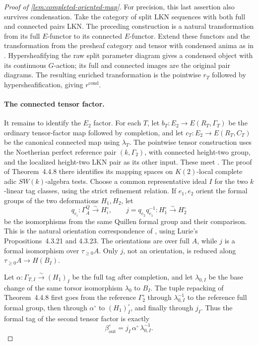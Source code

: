 \documentclass[11pt]{article}
\numberwithin{equation}{section}
\theoremstyle{definition}
\theoremstyle{remark}
\begin{document}
\begin{proof}[Proof of \cref{lem:completed-oriented-map}]
For precision, this last assertion also survives condensation. Take the
category of split LKN sequences with both full and connected pairs LKN.
The preceding construction is a natural transformation from its full
\(E\)-functor to its connected \(E\)-functor. Extend these functors and
the transformation from the presheaf category and tensor with condensed
anima as in \cite[Construction~4.5.2]{BMR2026}. Hypersheafifying the raw
split parameter diagram gives a condensed object with its continuous
\(G\)-action; its full and connected images are the original pair
diagrams. The resulting enriched transformation is the pointwise \(r_T\)
followed by hypersheafification, giving \(r^{\mathrm{cond}}\).

\paragraph{The connected tensor factor.}
It remains to identify the \(E_2\) factor. For each \(T\), let
\(b_T:E_2\to E(R_T,\Gamma_T)\) be the ordinary tensor-factor map followed
by completion, and let \(c_T:E_2\to E(R_T,C_T)\) be the canonical
connected map using \(\lambda_T\). The pointwise tensor construction uses
the Noetherian perfect reference pair \((k,\Gamma_2)\), with connected
height-two group, and the localized height-two LKN pair as its other
input. These meet \cite[Construction~4.4.7]{BMR2026}. The proof of
Theorem~4.4.8 there identifies its mapping spaces on \(K(2)\)-local
complete adic \(SW(k)\)-algebra tests. Choose a common representative
ideal \(I\) for the two \(k\)-linear tag classes, using the strict
refinement relation. If \(e_1,e_2\) orient the formal groups of the two
deformations \(H_1,H_2\), let
\[
 q_{e_i}:\Gamma_A^{Q}\xrightarrow{\sim}H_i^\circ,\qquad
 j=q_{e_2}q_{e_1}^{-1}:H_1^\circ\xrightarrow{\sim}H_2^\circ
\]
be the isomorphisms from the same Quillen formal group and their
comparison. This is the natural orientation correspondence of
\cite[Remark~4.1.18]{BMR2026}, using Lurie's Propositions~4.3.21 and
4.3.23. The orientations are over full \(A\), while \(j\) is a formal
isomorphism over \(\tau_{\geq0}A\). Only \(j\), not an orientation, is
reduced along \(\tau_{\geq0}A\to H(B_I)\).

Let \(\alpha:\Gamma_{T,I}\xrightarrow{\sim}(H_1)_I\) be the full tag
after completion, and let \(\lambda_{0,I}\) be the base change of the
same torsor isomorphism \(\lambda_0\) to \(B_I\). The tuple repacking of
Theorem~4.4.8 first goes from the reference \(\Gamma_2^\circ\) through
\(\lambda_{0,I}^{-1}\) to the reference full formal group, then through
\(\alpha^\circ\) to \((H_1)_I^\circ\), and finally through \(j_I\).
Thus the formal tag of the second tensor factor is exactly
\[
 \beta_{\mathrm{out}}^\circ
   =j_I\,\alpha^\circ\,\lambda_{0,I}^{-1}.
\]


\end{proof}
\end{document}
